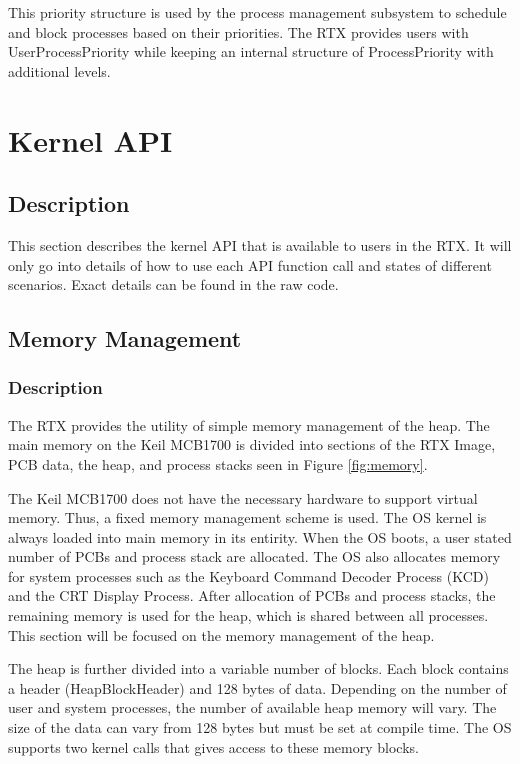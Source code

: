 \documentclass[12pt]{report}
\begin{document}
This priority structure is used by the process management subsystem to schedule and block processes based on their priorities. The RTX provides users with UserProcessPriority while keeping an internal structure of ProcessPriority with additional levels.

\chapter{Kernel API}
\section{Description}
This section describes the kernel API that is available to users in the RTX. It will only go into details of how to use each API function call and states of different scenarios. Exact details can be found in the raw code.

\section{Memory Management}
\subsection{Description}
The RTX provides the utility of simple memory management of the heap. The main memory on the Keil MCB1700 is divided into sections of the RTX Image, PCB data, the heap, and process stacks seen in Figure \ref{fig:memory}.

The Keil MCB1700 does not have the necessary hardware to support virtual memory. Thus, a fixed memory management scheme is used. The OS kernel is always loaded into main memory in its entirity. When the OS boots, a user stated number of PCBs and process stack are allocated. The OS also allocates memory for system processes such as the Keyboard Command Decoder Process (KCD) and the CRT Display Process. After allocation of PCBs and process stacks, the remaining memory is used for the heap, which is shared between all processes. This section will be focused on the memory management of the heap.

The heap is further divided into a variable number of blocks. Each block contains a header (HeapBlockHeader) and 128 bytes of data. Depending on the number of user and system processes, the number of available heap memory will vary. The size of the data can vary from 128 bytes but must be set at compile time. The OS supports two kernel calls that gives access to these memory blocks.
\end{document}
